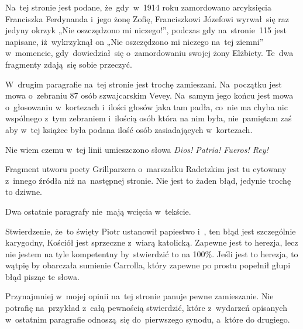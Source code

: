 \documentclass[a4paper,11pt]{article}
\begin{document}
\vspace{\spaceFour}


\start {} Na~tej stronie jest podane, że~gdy~w~1914 roku
zamordowano arcyksięcia Franciszka Ferdynanda i~jego żonę Zofię,
Franciszkowi Józefowi wyrwał~się raz jedyny okrzyk „Nie oszczędzono mi
niczego!”, podczas gdy na~stronie~115 jest napisane, iż~wykrzyknął on
„Nie oszczędzono mi niczego na~tej ziemni” w~momencie,
gdy~dowiedział~się o~zamordowaniu swojej żony Elżbiety. Te~dwa
fragmenty zdają~się sobie przeczyć.

\vspace{\spaceFour}


\start {} W~drugim paragrafie na~tej stronie jest trochę
zamieszani. Na~początku jest mowa o~zebraniu 87 osób szwajcarskim
Vevey. Na~samym jego końcu jest mowa o~głosowaniu w~kortezach i~ilości
głosów jaka tam padła, co~nie ma chyba nic wspólnego z~tym zebraniem
i~ilością osób która na nim była, nie~pamiętam zaś aby w~tej książce
była podana ilość osób zasiadających w~kortezach.

\vspace{\spaceFour}


\start {} Nie wiem czemu w~tej linii umieszczono słowa
\emph{Dios! Patria! Fueros! Rey!}

\vspace{\spaceFour}


\start {} Fragment utworu poety Grillparzera o~marszałku
Radetzkim jest tu cytowany z~innego źródła niż na~następnej stronie.
Nie jest to żaden błąd, jedynie trochę to dziwne.

\vspace{\spaceFour}


\start {} Dwa ostatnie paragrafy nie~mają wcięcia w~tekście.

\vspace{\spaceFour}


\start {} Stwierdzenie, że~to święty Piotr ustanowił papiestwo
i~, ten błąd jest szczególnie karygodny, Kościół jest sprzeczne
z~wiarą katolicką. Zapewne jest to herezja, lecz nie jestem na tyle
kompetentny by~stwierdzić to na 100\%. Jeśli jest to herezja, to
wątpię by obarczała sumienie Carrolla, który zapewne po prostu
popełnił głupi błąd pisząc te słowa.

\vspace{\spaceFour}


\start {} Przynajmniej w~mojej opinii na~tej stronie panuje
pewne zamieszanie. Nie potrafię na~przykład z~całą pewnością
stwierdzić, które z~wydarzeń opisanych w~ostatnim paragrafie
odnoszą~się do~pierwszego synodu, a~które do drugiego.
\end{document}

